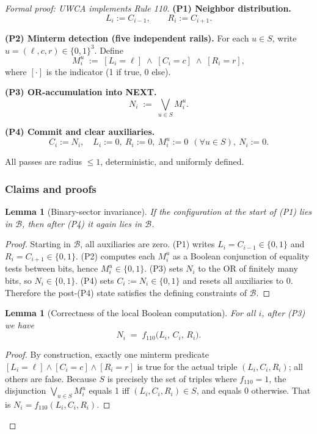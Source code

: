 \documentclass[12pt]{article}
\newtheorem{lemma}[theorem]{Lemma}
\numberwithin{equation}{section}
\begin{document}
\begin{proof}[Formal proof: UWCA implements Rule 110]
\textbf{(P1) Neighbor distribution.}
\[
L_i := C_{i-1},\qquad R_i := C_{i+1}.
\]

\textbf{(P2) Minterm detection (five independent rails).}
For each $u\in S$, write $u=(\ell,c,r)\in\{0,1\}^3$. Define
\[
M^u_i \;:=\; [L_i=\ell]\;\wedge\;[C_i=c]\;\wedge\;[R_i=r],
\]
where $[\cdot]$ is the indicator (1 if true, 0 else).

\textbf{(P3) OR-accumulation into NEXT.}
\[
N_i \;:=\; \bigvee_{u\in S} M^u_i.
\]

\textbf{(P4) Commit and clear auxiliaries.}
\[
C_i := N_i,\quad L_i:=0,\ R_i:=0,\ M^u_i:=0\ \ (\forall u\in S),\ N_i:=0.
\]

All passes are radius $\le1$, deterministic, and uniformly defined.

\subsubsection*{Claims and proofs}

\begin{lemma}[Binary-sector invariance]
If the configuration at the start of (P1) lies in $\mathcal B$, then after (P4) it again lies in $\mathcal B$.
\end{lemma}

\begin{proof}
Starting in $\mathcal B$, all auxiliaries are zero. (P1) writes $L_i=C_{i-1}\in\{0,1\}$ and $R_i=C_{i+1}\in\{0,1\}$. (P2) computes each $M^u_i$ as a Boolean conjunction of equality tests between bits, hence $M^u_i\in\{0,1\}$. (P3) sets $N_i$ to the OR of finitely many bits, so $N_i\in\{0,1\}$. (P4) sets $C_i:=N_i\in\{0,1\}$ and resets all auxiliaries to 0. Therefore the post-(P4) state satisfies the defining constraints of $\mathcal B$.
\end{proof}

\begin{lemma}[Correctness of the local Boolean computation]
For all $i$, after (P3) we have
\[
N_i \;=\; f_{110}\big(L_i,\,C_i,\,R_i\big).
\]
\end{lemma}

\begin{proof}
By construction, exactly one minterm predicate $[L_i=\ell]\wedge[C_i=c]\wedge[R_i=r]$ is true for the actual triple $(L_i,C_i,R_i)$; all others are false. Because $S$ is precisely the set of triples where $f_{110}=1$, the disjunction $\bigvee_{u\in S}M^u_i$ equals 1 iff $(L_i,C_i,R_i)\in S$, and equals 0 otherwise. That is $N_i=f_{110}(L_i,C_i,R_i)$.
\end{proof}


\end{proof}
\end{document}
